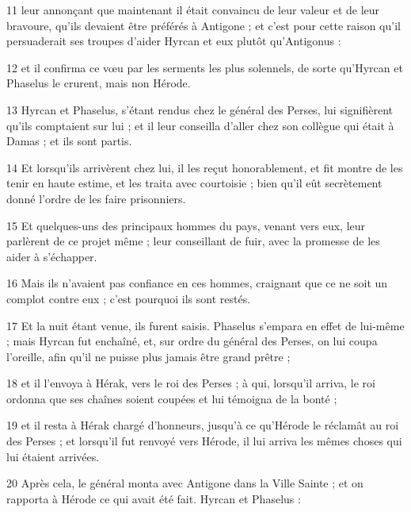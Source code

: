 \par 11 leur annonçant que maintenant il était convaincu de leur valeur et de leur bravoure, qu'ils devaient être préférés à Antigone ; et c'est pour cette raison qu'il persuaderait ses troupes d'aider Hyrcan et eux plutôt qu'Antigonus :

\par 12 et il confirma ce vœu par les serments les plus solennels, de sorte qu'Hyrcan et Phaselus le crurent, mais non Hérode.

\par 13 Hyrcan et Phaselus, s'étant rendus chez le général des Perses, lui signifièrent qu'ils comptaient sur lui ; et il leur conseilla d'aller chez son collègue qui était à Damas ; et ils sont partis.

\par 14 Et lorsqu'ils arrivèrent chez lui, il les reçut honorablement, et fit montre de les tenir en haute estime, et les traita avec courtoisie ; bien qu'il eût secrètement donné l'ordre de les faire prisonniers.

\par 15 Et quelques-uns des principaux hommes du pays, venant vers eux, leur parlèrent de ce projet même ; leur conseillant de fuir, avec la promesse de les aider à s'échapper.

\par 16 Mais ils n'avaient pas confiance en ces hommes, craignant que ce ne soit un complot contre eux ; c'est pourquoi ils sont restés.

\par 17 Et la nuit étant venue, ils furent saisis. Phaselus s'empara en effet de lui-même ; mais Hyrcan fut enchaîné, et, sur ordre du général des Perses, on lui coupa l'oreille, afin qu'il ne puisse plus jamais être grand prêtre ;

\par 18 et il l'envoya à Hérak, vers le roi des Perses ; à qui, lorsqu'il arriva, le roi ordonna que ses chaînes soient coupées et lui témoigna de la bonté ;

\par 19 et il resta à Hérak chargé d'honneurs, jusqu'à ce qu'Hérode le réclamât au roi des Perses ; et lorsqu'il fut renvoyé vers Hérode, il lui arriva les mêmes choses qui lui étaient arrivées.

\par 20 Après cela, le général monta avec Antigone dans la Ville Sainte ; et on rapporta à Hérode ce qui avait été fait. Hyrcan et Phaselus :

